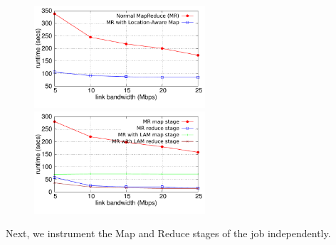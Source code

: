 \begin{figure}[ht]
	\centering
	\begin{minipage}[b]{0.48\linewidth}
		\includegraphics[width=2.5in]{figs/job-time-localMap.pdf}
		\caption{}
		\label{fig:job-time-localMap}
	\end{minipage}
	\quad
	\begin{minipage}[b]{0.48\linewidth}
		\includegraphics[width=2.5in]{figs/stage-time-localMap.pdf}
		\caption{}
		\label{fig:stage-time-localMap}
	\end{minipage}
\end{figure}


Next, we instrument the Map and Reduce stages of the job independently.

